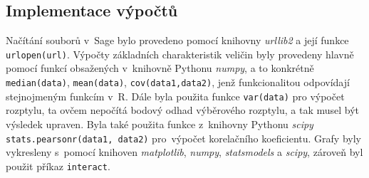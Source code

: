 \documentclass[thesis=B,czech]{FITthesis}[2012/06/26]
\begin{document}
\subsection{Implementace výpočtů}
\begin{sloppypar}

Načítání souborů v~Sage bylo provedeno pomocí knihovny \textit{urllib2} a její funkce \texttt{urlopen(url)}. 
Výpočty základních charakteristik veličin byly provedeny hlavně pomocí funkcí obsažených v~knihovně Pythonu \textit{numpy}, a to konkrétně \texttt{median(data)}, \texttt{mean(data)}, \texttt{cov(data1,data2)}, jenž funkcionalitou odpovídají stejnojmeným funkcím v~R. Dále byla použita funkce \texttt{var(data)} pro výpočet rozptylu, ta ovčem nepočítá bodový odhad výběrového rozptylu, a tak musel být výsledek upraven. Byla také použita funkce z~knihovny Pythonu \textit{scipy} \texttt{stats.pearsonr(data1, data2)} pro~výpočet korelačního koeficientu.   
Grafy byly vykresleny s~pomocí knihoven \textit{matplotlib}, \textit{numpy}, \textit{statsmodels} a \textit{scipy}, zároveň byl použit příkaz \texttt{interact}. 


\end{sloppypar}
\end{document}
